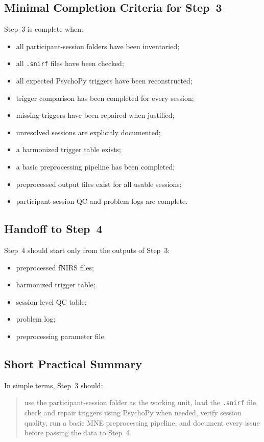 \documentclass[11pt]{article}
\begin{document}
\subsection{Minimal Completion Criteria for Step~3}
Step~3 is complete when:
\begin{itemize}
    \item all participant-session folders have been inventoried;
    \item all \texttt{.snirf} files have been checked;
    \item all expected PsychoPy triggers have been reconstructed;
    \item trigger comparison has been completed for every session;
    \item missing triggers have been repaired when justified;
    \item unresolved sessions are explicitly documented;
    \item a harmonized trigger table exists;
    \item a basic preprocessing pipeline has been completed;
    \item preprocessed output files exist for all usable sessions;
    \item participant-session QC and problem logs are complete.
\end{itemize}

\subsection{Handoff to Step~4}
Step~4 should start only from the outputs of Step~3:
\begin{itemize}
    \item preprocessed fNIRS files;
    \item harmonized trigger table;
    \item session-level QC table;
    \item problem log;
    \item preprocessing parameter file.
\end{itemize}

\subsection{Short Practical Summary}
In simple terms, Step~3 should:
\begin{quote}
use the participant-session folder as the working unit, load the \texttt{.snirf} file,
check and repair triggers using PsychoPy when needed, verify session quality, run a basic
MNE preprocessing pipeline, and document every issue before passing the data to Step~4.
\end{quote}
\end{document}
